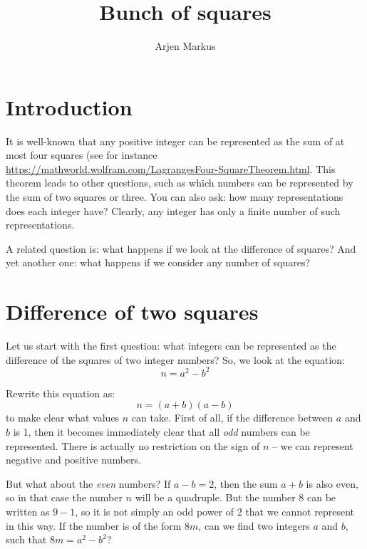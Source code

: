 \documentclass[onecolumn]{article}
\begin{document}
\title{Bunch of squares}

\author{Arjen Markus}

\maketitle

\section*{Introduction}
It is well-known that any positive integer can be represented as the sum of at most four squares
(see for instance \url{https://mathworld.wolfram.com/LagrangesFour-SquareTheorem.html}. This theorem
leads to other questions, such as which numbers can be represented by the sum of two squares or three.
You can also ask: how many representations does each integer have? Clearly, any integer has only a
finite number of such representations.

A related question is: what happens if we look at the difference of squares? And yet another one:
what happens if we consider any number of squares?

\section{Difference of two squares}
Let us start with the first question: what integers can be represented as the difference of the squares
of two integer numbers? So, we look at the equation:
\begin{equation}
    n = a^2 - b^2
\end{equation}

Rewrite this equation as:
\begin{equation}
\label{eqab}
    n = (a + b) (a - b)
\end{equation}
\noindent to make clear what values $n$ can take. First of all, if the difference between $a$ and $b$
is 1, then it becomes immediately clear that all \emph{odd} numbers can be represented. There is
actually no restriction on the sign of $n$ -- we can represent negative and positive numbers.

But what about the \emph{even} numbers? If $a - b = 2$, then the sum $a + b$ is also even, so in that
case the number $n$ will be a quadruple. But the number 8 can be written as $9 - 1$, so it is not simply
an odd power of 2 that we cannot represent in this way. If the number is of the form $8m$, can we
find two integers $a$ and $b$, such that $8m = a^2 - b^2$?
\end{document}
